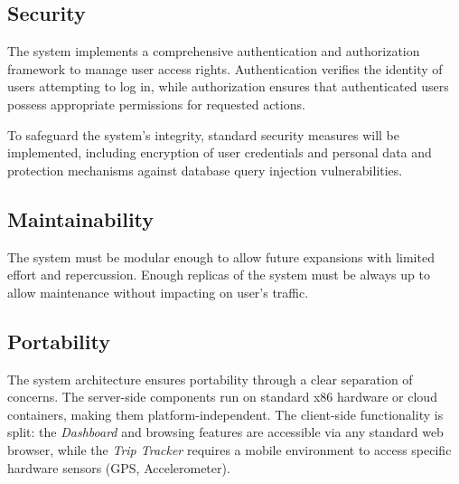 \subsection{Security}
\label{subsec:security}%

\par The system implements a comprehensive authentication and authorization framework to manage user access rights.
Authentication verifies the identity of users attempting to log in, while authorization ensures that authenticated
users possess appropriate permissions for requested actions.

\par To safeguard the system's integrity, standard security measures will be implemented, including encryption of user
credentials and personal data and protection mechanisms against database query injection vulnerabilities.

\subsection{Maintainability}
\label{subsec:maintainability}%

\par The system must be modular enough to allow future expansions with limited effort and repercussion. Enough replicas
of the system must be always up to allow maintenance without impacting on user’s traffic.

\subsection{Portability}
\label{subsec:portability}%

\par The system architecture ensures portability through a clear separation of concerns. The server-side components run on standard x86 hardware or cloud containers, making them platform-independent. The client-side functionality is split: the \textit{Dashboard} and browsing features are accessible via any standard web browser, while the \textit{Trip Tracker} requires a mobile environment to access specific hardware sensors (GPS, Accelerometer).
